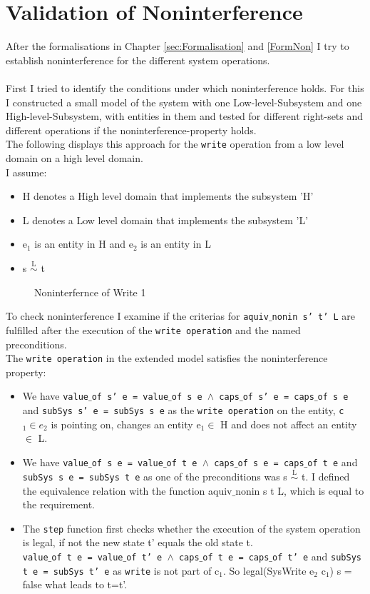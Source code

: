 \chapter{Validation of Noninterference}\label{ValNon}
After the formalisations in Chapter \ref{sec:Formalisation} and \ref{FormNon} I try to establish noninterference for the different system operations.\\ \\
First I tried to identify the conditions under which noninterference holds. For this I constructed a small model of the system with one Low-level-Subsystem and one High-level-Subsystem, with entities in them and tested for different right-sets and different operations if the noninterference-property holds. \\
The following displays this approach for the \texttt{write} operation from a low level domain on a high level domain. \\
I assume: \\ 
\begin{itemize}
\item H denotes a High level domain that implements the subsystem 'H'
\item L denotes a Low level domain that implements the subsystem 'L'
\item e$_1$ is an entity in H and e$_2$ is an entity in L
\item s $\overset{\text{L}}{\sim}$ t
\end{itemize} 
\begin{figure}[H]
\caption{Noninterfernce of Write 1}
\end{figure}
To check noninterference I examine if the criterias for \texttt{aquiv$\_$nonin s' t' L} are fulfilled after the execution of the \texttt{write operation} and the named preconditions. \\ 
The \texttt{write operation} in the extended model satisfies the noninterference property: 
\begin{itemize}
\item We have \texttt{value$\_$of s' e = value$\_$of s e $\wedge$ caps$\_$of s' e = caps$\_$of s e} and \texttt{subSys s' e = subSys s e} as the \texttt{write operation} on the entity, \texttt{c$_1 \in e_2$} is pointing on, changes an entity e$_1 \in$ H and does not affect an entity $\in$ L.
\item We have \texttt{value$\_$of s e = value$\_$of t e $\wedge$ caps$\_$of s e = caps$\_$of t e} and \texttt{subSys s e = subSys t e} as one of the preconditions was s $\overset{\text{L}}{\sim}$ t. I defined the equivalence relation with the function aquiv$\_$nonin s t L, which is equal to the requirement. 
\item The \texttt{step} function first checks whether the execution of the system operation is legal, if not the new state t' equals the old state t. \\
\texttt{value$\_$of t e = value$\_$of t' e $\wedge$ caps$\_$of t e = caps$\_$of t' e} and \texttt{subSys t e = subSys t' e} as \texttt{write} is not part of c$_1$. So legal(SysWrite e$_2$ c$_1$) s = false what leads to t=t'. \\
\end{itemize} 
